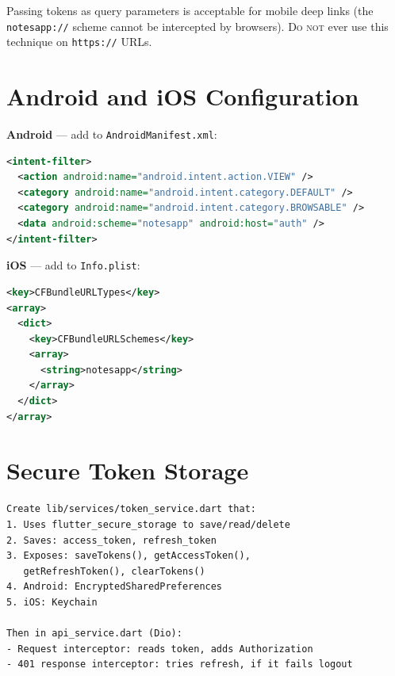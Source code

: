 \begin{warnbox}
Passing tokens as query parameters is acceptable for mobile deep links (the \texttt{notesapp://} scheme cannot be intercepted by browsers). \textsc{Do not} ever use this technique on \texttt{https://} URLs.
\end{warnbox}

\section{Android and iOS Configuration}

\textbf{Android} --- add to \texttt{AndroidManifest.xml}:
\begin{lstlisting}[language=XML]
<intent-filter>
  <action android:name="android.intent.action.VIEW" />
  <category android:name="android.intent.category.DEFAULT" />
  <category android:name="android.intent.category.BROWSABLE" />
  <data android:scheme="notesapp" android:host="auth" />
</intent-filter>
\end{lstlisting}

\textbf{iOS} --- add to \texttt{Info.plist}:
\begin{lstlisting}[language=XML]
<key>CFBundleURLTypes</key>
<array>
  <dict>
    <key>CFBundleURLSchemes</key>
    <array>
      <string>notesapp</string>
    </array>
  </dict>
</array>
\end{lstlisting}

\section{Secure Token Storage}

\begin{praticabox}[title={Hands-on --- Token service}]
\begin{lstlisting}[language={}]
Create lib/services/token_service.dart that:
1. Uses flutter_secure_storage to save/read/delete
2. Saves: access_token, refresh_token
3. Exposes: saveTokens(), getAccessToken(),
   getRefreshToken(), clearTokens()
4. Android: EncryptedSharedPreferences
5. iOS: Keychain

Then in api_service.dart (Dio):
- Request interceptor: reads token, adds Authorization
- 401 response interceptor: tries refresh, if it fails logout
\end{lstlisting}
\end{praticabox}

